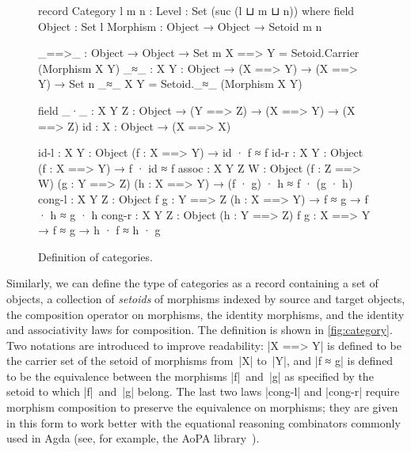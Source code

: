 \begin{figure}
\codefigure
\begin{code}
record Category {l m n : Level} : Set (suc (l ⊔ m ⊔ n)) where
  field
    Object    :  Set l
    Morphism  :  Object → Object → Setoid {m} {n}

  _==>_ : Object → Object → Set m
  X ==> Y = Setoid.Carrier (Morphism X Y)
  _≈_ : {X Y : Object} → (X ==> Y) → (X ==> Y) → Set n
  _≈_ {X} {Y} = Setoid._≈_ (Morphism X Y)

  field
    _·_  :   {X Y Z : Object} → (Y ==> Z) → (X ==> Y) → (X ==> Z)
    id   :   {X : Object} → (X ==> X)

    id-l    :  {X Y : Object} (f : X ==> Y) →
               id · f ≈ f
    id-r    :  {X Y : Object} (f : X ==> Y) →
               f · id ≈ f
    assoc   :  {X Y Z W : Object} (f : Z ==> W) (g : Y ==> Z) (h : X ==> Y) →
               (f · g) · h ≈ f · (g · h)
    cong-l  :  {X Y Z : Object} {f g : Y ==> Z} (h : X ==> Y) →
               f ≈ g → f · h ≈ g · h
    cong-r  :  {X Y Z : Object} (h : Y ==> Z) {f g : X ==> Y} →
               f ≈ g → h · f ≈ h · g
\end{code}
\caption{Definition of categories.}
\label{fig:category}
\end{figure}

Similarly, we can define the type of categories as a record containing a set of objects, a collection of \emph{setoids} of morphisms indexed by source and target objects, the composition operator on morphisms, the identity morphisms, and the identity and associativity laws for composition.
The definition is shown in \autoref{fig:category}.
Two notations are introduced to improve readability: |X ==> Y| is defined to be the carrier set of the setoid of morphisms from~|X| to~|Y|, and |f ≈ g| is defined to be the equivalence between the morphisms |f|~and~|g| as specified by the setoid to which |f|~and~|g| belong.
The last two laws |cong-l| and |cong-r| require morphism composition to preserve the equivalence on morphisms; they are given in this form to work better with the equational reasoning combinators commonly used in Agda (see, for example, the AoPA library~\citep{Mu-AoPA}).

